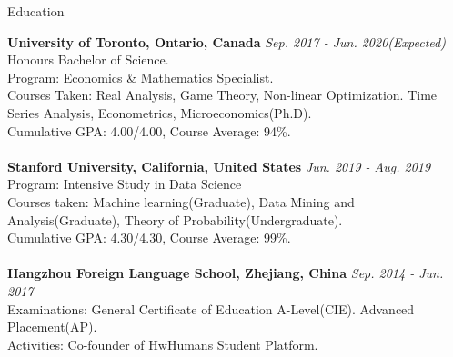 \documentclass{resume} %
\begin{document}

\begin{rSection}{Education}

{\bf University of Toronto, Ontario, Canada} \hfill {\em Sep. 2017 - Jun. 2020(Expected)} 
\\ Honours Bachelor of Science.
\\ Program: Economics \& Mathematics Specialist.
\\ Courses Taken: Real Analysis, Game Theory, Non-linear Optimization. Time Series Analysis, Econometrics, Microeconomics(Ph.D).
\\ Cumulative GPA: 4.00/4.00, Course Average: 94\%.
\\
\\{\bf Stanford University, California, United States} \hfill {\em Jun. 2019 - Aug. 2019} 
\\ Program: Intensive Study in Data Science
\\ Courses taken: Machine learning(Graduate), Data Mining and Analysis(Graduate), Theory of Probability(Undergraduate).
\\ Cumulative GPA: 4.30/4.30, Course Average: 99\%.
\\
\\{\bf Hangzhou Foreign Language School, Zhejiang, China} \hfill {\em Sep. 2014 - Jun. 2017} 
\\ Examinations: General Certificate of Education A-Level(CIE). Advanced Placement(AP).
\\ Activities: Co-founder of HwHumans Student Platform.


\end{rSection}
\end{document}
